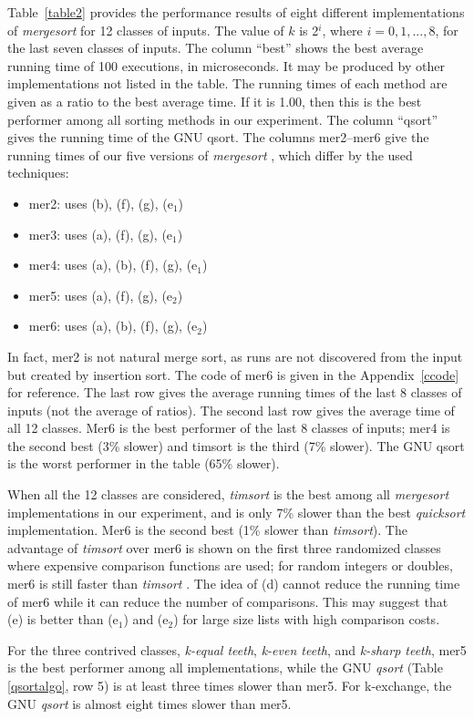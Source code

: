 \documentclass[AMA,STIX1COL]{WileyNJD-v2}
\newcommand{\keq}{\emph{k-equal teeth}}
\newcommand{\kev}{\emph{k-even teeth}}
\newcommand{\ksha}{\emph{k-sharp teeth}}
\newcommand{\qusort}{\emph{quicksort }}
\newcommand{\qsort}{\emph{qsort }}
\newcommand{\tsort}{\emph{timsort }}
\newcommand{\tsortn}{\emph{timsort}}
\newcommand{\msort}{\emph{mergesort }}
\begin{document}
Table~\ref{table2} provides the performance results of eight different implementations of \msort for 12 classes of inputs. The value of $k$ is 2$^i$, where $i = 0, 1, ..., 8$, for the last seven classes of inputs. The column “best” shows the best average running time of 100 executions, in microseconds. It may be produced by other implementations not listed in the table. The running times of each method are given as a ratio to the best average time. If it is 1.00, then this is the best performer among all sorting methods in our experiment. The column “qsort” gives the running time of the GNU qsort. The columns mer2–mer6 give the running times of our five versions of \msort, which differ by the used techniques:
\begin{itemize}
\item mer2: uses (b), (f), (g), (e$_1$)
\item mer3: uses (a), (f), (g), (e$_1$)
\item mer4: uses (a), (b), (f), (g), (e$_1$)
\item mer5: uses (a), (f), (g), (e$_2$)
\item mer6: uses (a), (b), (f), (g), (e$_2$)
\end{itemize}

In fact, mer2 is not natural merge sort, as runs are not discovered from the input but created by insertion sort. 
The code of mer6 is given in the Appendix~\ref{ccode} for reference.  
The last row gives the average running times of the last 8 classes of inputs (not the average of ratios). 
The second last row gives the average time of all 12 classes. 
Mer6 is the best performer of the last 8 classes of inputs; mer4 is the second best (3\% slower) and timsort is the third (7\% slower). 
The GNU qsort is the worst performer in the table (65\% slower).

When all the 12 classes are considered, \tsort is the best among all \msort implementations in our experiment, and is only 7\% slower than the best \qusort implementation. Mer6 is the second best (1\% slower than \tsortn). 
The advantage of \tsort over mer6 is shown on the first three randomized classes where expensive comparison functions are used; for random integers or doubles, mer6 is still faster than \tsort. 
The idea of (d) cannot reduce the running time of mer6 while it can reduce the number of comparisons. 
This may suggest that (e) is better than (e$_1$) and (e$_2$) for large size lists with high comparison costs. 

For the three contrived classes, \keq, \kev, and \ksha, mer5 is the best performer among all implementations, while the GNU \qsort(Table \ref{qsortalgo}, row 5) is at least three times slower than mer5. 
For k-exchange, the GNU \qsort is almost eight times slower than mer5.  
\end{document}
